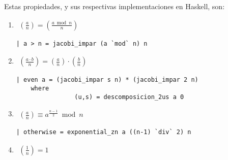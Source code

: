 \documentclass[10pt,spanish]{article}
\begin{document}
Estas propiedades, y sus respectivas implementaciones en Haskell, son:

\begin{enumerate}[1.]
\item 
\begin{equation*}
    \begin{aligned}
    \left( \frac{a}{n} \right) = \left( \frac{a \bmod n}{n} \right)
    \end{aligned}
    \phantom{\hspace{18cm}}
\end{equation*}

\begin{verbatim}
| a > n = jacobi_impar (a `mod` n) n 
\end{verbatim}

\item 
\begin{equation*}
    \begin{aligned}
    \left( \frac{a \cdot b}{n} \right) = \left( \frac{a}{n} \right) \cdot \left( \frac{b}{n} \right)
    \end{aligned}
    \phantom{\hspace{18cm}}
\end{equation*}

\begin{verbatim}
| even a = (jacobi_impar s n) * (jacobi_impar 2 n)
    where
                (u,s) = descomposicion_2us a 0

\end{verbatim}

\item
\begin{equation*}
    \begin{aligned}
    \left( \frac{a}{n} \right) \equiv a^{\frac{n-1}{2}} \bmod n
    \end{aligned}
    \phantom{\hspace{18cm}}
\end{equation*}

\begin{verbatim}
| otherwise = exponential_zn a ((n-1) `div` 2) n
\end{verbatim}

\item
\begin{equation*}
    \begin{aligned}
    \left( \frac{1}{n} \right) = 1
    \end{aligned}
    \phantom{\hspace{18cm}}
\end{equation*}


\end{enumerate}
\end{document}
